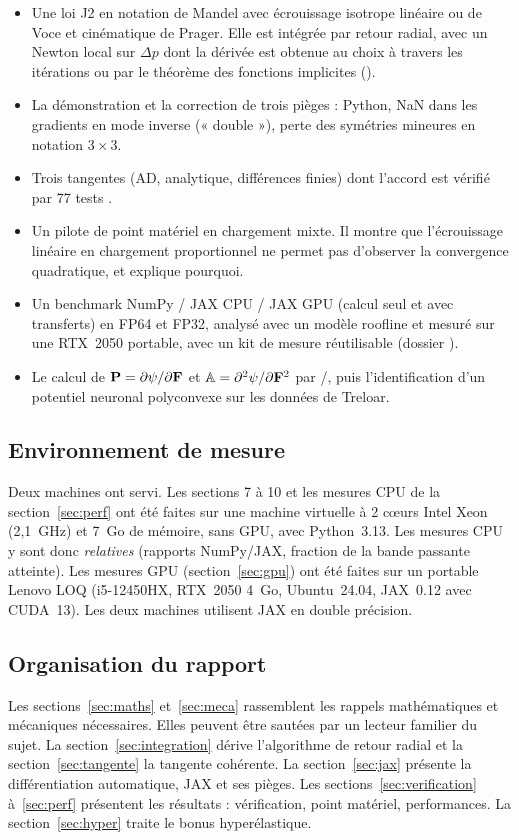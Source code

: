 \begin{itemize}[nosep]
  \item Une loi J2 en notation de Mandel avec écrouissage isotrope linéaire ou de Voce et cinématique de Prager. Elle est intégrée par retour radial, avec un Newton local sur $\Delta p$ dont la dérivée est obtenue au choix à travers les itérations ou par le théorème des fonctions implicites ().
  \item La démonstration et la correction de trois pièges :  Python, NaN dans les gradients en mode inverse (« double  »), perte des symétries mineures en notation $3\times3$.
  \item Trois tangentes (AD, analytique, différences finies) dont l'accord est vérifié par 77 tests .
  \item Un pilote de point matériel en chargement mixte. Il montre que l'écrouissage linéaire en chargement proportionnel ne permet pas d'observer la convergence quadratique, et explique pourquoi.
  \item Un benchmark NumPy / JAX CPU / JAX GPU (calcul seul et avec transferts) en FP64 et FP32, analysé avec un modèle roofline et mesuré sur une RTX~2050 portable, avec un kit de mesure réutilisable (dossier ).
  \item Le calcul de $\mathbf{P} = \partial\psi/\partial\mathbf{F}$ et $\mathbb{A}=\partial^2\psi/\partial\mathbf{F}^2$ par /, puis l'identification d'un potentiel neuronal polyconvexe sur les données de Treloar.
\end{itemize}

\subsection{Environnement de mesure}

Deux machines ont servi. Les sections 7 à 10 et les mesures CPU de la section~\ref{sec:perf} ont été faites sur une machine virtuelle à 2 cœurs Intel Xeon (2,1~GHz) et 7~Go de mémoire, sans GPU, avec Python~3.13. Les mesures CPU y sont donc \emph{relatives} (rapports NumPy/JAX, fraction de la bande passante atteinte). Les mesures GPU (section~\ref{sec:gpu}) ont été faites sur un portable Lenovo LOQ (i5-12450HX, RTX~2050 4~Go, Ubuntu~24.04, JAX~0.12 avec CUDA~13). Les deux machines utilisent JAX en double précision.

\subsection{Organisation du rapport}

Les sections~\ref{sec:maths} et~\ref{sec:meca} rassemblent les rappels mathématiques et mécaniques nécessaires. Elles peuvent être sautées par un lecteur familier du sujet. La section~\ref{sec:integration} dérive l'algorithme de retour radial et la section~\ref{sec:tangente} la tangente cohérente. La section~\ref{sec:jax} présente la différentiation automatique, JAX et ses pièges. Les sections~\ref{sec:verification} à~\ref{sec:perf} présentent les résultats : vérification, point matériel, performances. La section~\ref{sec:hyper} traite le bonus hyperélastique.
